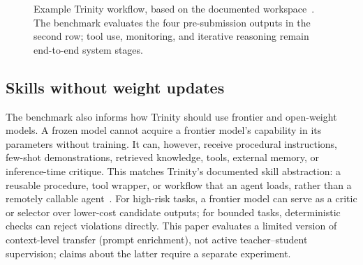 \documentclass[conference]{IEEEtran}
\begin{document}
\begin{figure}[t]
\centering
{}
\caption{Example Trinity workflow, based on the documented workspace~\cite{trinitydocs}. The benchmark evaluates the four pre-submission outputs in the second row; tool use, monitoring, and iterative reasoning remain end-to-end system stages.}
\label{fig:architecture}
\end{figure}

\subsection{Skills without weight updates}
The benchmark also informs how Trinity should use frontier and open-weight models. A frozen model cannot acquire a frontier model's capability in its parameters without training. It can, however, receive procedural instructions, few-shot demonstrations, retrieved knowledge, tools, external memory, or inference-time critique. This matches Trinity's documented skill abstraction: a reusable procedure, tool wrapper, or workflow that an agent loads, rather than a remotely callable agent~\cite{trinitydocs}. For high-risk tasks, a frontier model can serve as a critic or selector over lower-cost candidate outputs; for bounded tasks, deterministic checks can reject violations directly. This paper evaluates a limited version of context-level transfer (prompt enrichment), not active teacher--student supervision; claims about the latter require a separate experiment.
\end{document}
